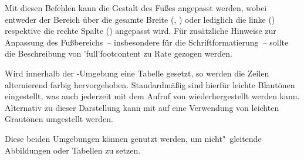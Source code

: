 \begin{DeclareEntity}{}
\begin{Declaration}
\begin{Declaration}
\begin{Declaration}
\begin{Declaration}
Mit diesen Befehlen kann die Gestalt des Fußes angepasst werden, wobei entweder 
der Bereich über die gesamte Breite (, ) 
oder lediglich die linke () respektive die rechte Spalte 
() angepasst wird. Für zusätzliche Hinweise zur Anpassung 
des Fußbereichs~-- insbesondere für die Schriftformatierung~-- sollte die 
Beschreibung von \Macro*'full'{footcontent} zu Rate gezogen werden.
\end{Declaration}
\end{Declaration}
\end{Declaration}
\end{Declaration}

\begin{Declaration}
  {}
\begin{Declaration}
  {}
\begin{Declaration}
  {}
\printdeclarationlist

Wird innerhalb der -Umgebung eine Tabelle gesetzt, 
so werden die Zeilen alternierend farbig hervorgehoben. Standardmäßig sind 
hierfür leichte Blautönen eingestellt, was auch jederzeit mit dem Aufruf von 
 wiederhergestellt werden kann. Alternativ zu dieser 
Darstellung kann mit  auf eine Verwendung von leichten 
Grautönen umgestellt werden.
\end{Declaration}
\end{Declaration}
\end{Declaration}

\begin{Declaration}
  {}
\begin{Declaration}
  {}
\printdeclarationlist

Diese beiden Umgebungen können genutzt werden, um nicht"~gleitende Abbildungen 
oder Tabellen zu setzen.
\end{Declaration}
\end{Declaration}

\begin{Declaration}
  {}
\printdeclarationlist


\end{Declaration}
\end{DeclareEntity}
